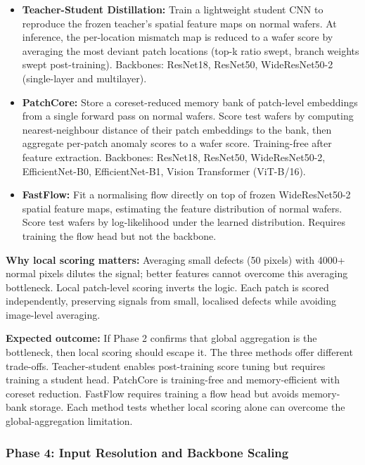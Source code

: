 \documentclass[11pt]{article}
\begin{document}
\begin{itemize}[leftmargin=1.5em]
  \item \textbf{Teacher-Student Distillation:} Train a lightweight student CNN to reproduce the frozen teacher's
    spatial feature maps on normal wafers. At inference, the per-location mismatch map is reduced to a wafer score
    by averaging the most deviant patch locations (top-k ratio swept, branch weights swept post-training).
    Backbones: ResNet18, ResNet50, WideResNet50-2 (single-layer and multilayer).

  \item \textbf{PatchCore:} Store a coreset-reduced memory bank of patch-level embeddings from a single forward
    pass on normal wafers. Score test wafers by computing nearest-neighbour distance of their patch embeddings
    to the bank, then aggregate per-patch anomaly scores to a wafer score. Training-free after feature extraction.
    Backbones: ResNet18, ResNet50, WideResNet50-2, EfficientNet-B0, EfficientNet-B1, Vision Transformer (ViT-B/16).

  \item \textbf{FastFlow:} Fit a normalising flow directly on top of frozen WideResNet50-2 spatial feature maps,
    estimating the feature distribution of normal wafers. Score test wafers by log-likelihood under the learned
    distribution. Requires training the flow head but not the backbone.

\end{itemize}

\textbf{Why local scoring matters:} Averaging small defects (50 pixels) with 4000+ normal pixels dilutes the signal;
better features cannot overcome this averaging bottleneck. Local patch-level scoring inverts the logic. Each patch
is scored independently, preserving signals from small, localised defects while avoiding image-level averaging.

\textbf{Expected outcome:} If Phase 2 confirms that global aggregation is the bottleneck, then local scoring should
escape it. The three methods offer different trade-offs. Teacher-student enables post-training score tuning but
requires training a student head. PatchCore is training-free and memory-efficient with coreset reduction. FastFlow
requires training a flow head but avoids memory-bank storage. Each method tests whether local scoring alone can
overcome the global-aggregation limitation.


\subsubsection{Phase 4: Input Resolution and Backbone Scaling}
\end{document}
